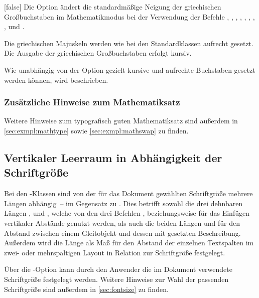 \begin{Declaration*}{}
\begin{Declaration*}{}
\begin{Declaration*}{}
\begin{Declaration}{}[false]
\printdeclarationlist%
%
Die Option ändert die standardmäßige Neigung der griechischen Großbuchstaben im 
Mathematikmodus bei der Verwendung der Befehle , , 
, , , , , 
,  und .
%
\begin{values}{}
\itemfalse
  Die griechischen Majuskeln werden wie bei den Standardklassen aufrecht 
  gesetzt.
\itemtrue*
  Die Ausgabe der griechischen Großbuchstaben erfolgt kursiv.
\end{values}
%
Wie unabhängig von der Option  gezielt kursive und 
aufrechte Buchstaben gesetzt werden können, wird  
beschrieben.
%
\end{Declaration}


\subsubsection{Zusätzliche Hinweise zum Mathematiksatz}
Weitere Hinweise zum typografisch guten Mathematiksatz sind außerdem in 
\autoref{sec:exmpl:mathtype} sowie \autoref{sec:exmpl:mathswap} zu finden.
%


\subsection{Vertikaler Leerraum in Abhängigkeit der Schriftgröße}
%
%
%
Bei den \TUDScript-Klassen sind von der für das Dokument gewählten Schriftgröße 
mehrere Längen abhängig~-- im Gegensatz zu \KOMAScript. Dies betrifft sowohl 
die drei dehnbaren Längen ,  
und , welche von den drei Befehlen , 
 beziehungsweise  für das Einfügen vertikaler 
Abstände genutzt werden, als auch die beiden Längen  
und  für den Abstand zwischen einem Gleitobjekt und 
dessen mit  gesetzten Beschreibung. Außerdem wird die Länge 
 als Maß für den Abstand der einzelnen Textspalten im zwei- 
oder mehrspaltigen Layout in Relation zur Schriftgröße festgelegt.

Über die \KOMAScript-Option  kann durch 
den Anwender die im Dokument verwendete Schriftgröße festgelegt werden.
 Weitere Hinweise zur Wahl der passenden Schriftgröße sind außerdem in 
\autoref{sec:fontsize} zu finden.


\end{Declaration*}
\end{Declaration*}
\end{Declaration*}
